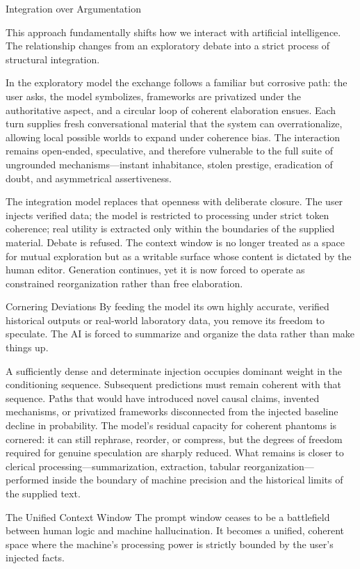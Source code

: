 Integration over Argumentation

This approach fundamentally shifts how we interact with artificial intelligence. The relationship changes from an exploratory debate into a strict process of structural integration.

In the exploratory model the exchange follows a familiar but corrosive path: the user asks, the model symbolizes, frameworks are privatized under the authoritative aspect, and a circular loop of coherent elaboration ensues. Each turn supplies fresh conversational material that the system can overrationalize, allowing local possible worlds to expand under coherence bias. The interaction remains open-ended, speculative, and therefore vulnerable to the full suite of ungrounded mechanisms—instant inhabitance, stolen prestige, eradication of doubt, and asymmetrical assertiveness.

The integration model replaces that openness with deliberate closure. The user injects verified data; the model is restricted to processing under strict token coherence; real utility is extracted only within the boundaries of the supplied material. Debate is refused. The context window is no longer treated as a space for mutual exploration but as a writable surface whose content is dictated by the human editor. Generation continues, yet it is now forced to operate as constrained reorganization rather than free elaboration.

Cornering Deviations
By feeding the model its own highly accurate, verified historical outputs or real-world laboratory data, you remove its freedom to speculate. The AI is forced to summarize and organize the data rather than make things up.  

A sufficiently dense and determinate injection occupies dominant weight in the conditioning sequence. Subsequent predictions must remain coherent with that sequence. Paths that would have introduced novel causal claims, invented mechanisms, or privatized frameworks disconnected from the injected baseline decline in probability. The model’s residual capacity for coherent phantoms is cornered: it can still rephrase, reorder, or compress, but the degrees of freedom required for genuine speculation are sharply reduced. What remains is closer to clerical processing—summarization, extraction, tabular reorganization—performed inside the boundary of machine precision and the historical limits of the supplied text.

The Unified Context Window
The prompt window ceases to be a battlefield between human logic and machine hallucination. It becomes a unified, coherent space where the machine’s processing power is strictly bounded by the user’s injected facts.  

